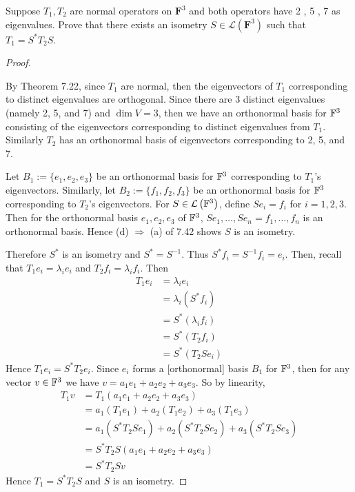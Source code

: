 Suppose $T_1 , T_2$ are normal operators on $\mathbf{F}^3$ and both operators have 2 , 5 , 7 as eigenvalues. Prove that there exists an isometry $S \in \mathcal{L}(\mathbf{F}^3)$ such that $T_1 = S^*T_2S$.

\begin{proof} $ $
    
    \nl By Theorem 7.22, since $T_1$ are normal, then the eigenvectors of $T_1$ corresponding to distinct eigenvalues are orthogonal. Since there are 3 distinct eigenvalues (namely 2, 5, and 7) and $\dim V = 3$, then we have an orthonormal basis for $\mathbb{F}^3$ consisting of the eigenvectors corresponding to distinct eigenvalues from $T_1$. Similarly $T_2$ has an orthonormal basis of eigenvectors corresponding to 2, 5, and 7.

    \nl Let $B_1 := \{e_1, e_2, e_3\}$ be an orthonormal basis for $\mathbb{F}^3$ corresponding to $T_1$'s eigenvectors. Similarly, let $B_2 := \{f_1, f_2, f_3\}$ be an orthonormal basis for $\mathbb{F}^3$ corresponding to $T_2$'s eigenvectors. For $S \in \mathcal{L}\left({\mathbb{F}^3}\right)$, define $Se_i = f_i$ for $i = 1, 2, 3$. Then for the orthonormal basis $e_1, e_2, e_3$ of $\mathbb{F}^3$, $Se_1, \dots, Se_n = f_1, \dots, f_n$ is an orthonormal basis. Hence (d) $\Rightarrow$ (a) of 7.42 shows $S$ is an isometry. 

    \nl Therefore $S^*$ is an isometry and $S^* = S^{-1}$. Thus $S^*f_i = S^{-1}f_i = e_i$. Then, recall that $T_1 e_i = \lambda_i e_i$ and $T_2 f_i = \lambda_i f_i$. Then
    \begin{align*}
        T_1e_i &= \lambda_i e_i \tag{eigenvalues for eigenvectors}\\
        &= \lambda_i (S^* f_i) \tag{substitution}\\
        &= S^* (\lambda_i f_i) \tag{linearity}\\
        &= S^* (T_2 f_i) \tag{substitution}\\
        &= S^* (T_2 S e_i) \tag{substitution}
    \end{align*}
    Hence $T_1 e_i = S^* T_2 e_i$. Since $e_i$ forms a [orthonormal] basis $B_1$ for $\mathbb{F}^3$, then for any vector $v \in \mathbb{F}^3$ we have $v = a_1e_1 + a_2e_2 + a_3e_3$. So by linearity, 
    \begin{align*}
        T_1 v & = T_1 (a_1e_1 + a_2e_2 + a_3e_3) \tag{substitution of $v$}\\
        &= a_1(T_1 e_1) + a_2(T_1 e_2) + a_3(T_1 e_3) \tag{linearity}\\
        &= a_1(S^*T_2S e_1) + a_2(S^*T_2S e_2) + a_3(S^*T_2S e_3) \tag{substitution of $T_1 e_i = S^*T_2Se_i$}\\
        &= S^*T_2S(a_1e_1 + a_2 e_2 + a_3 e_3) \tag{linearity}\\
        &= S^*T_2S v \tag{substitution of $v$}
    \end{align*}
    Hence $T_1 = S^*T_2S$ and $S$ is an isometry.
\end{proof}